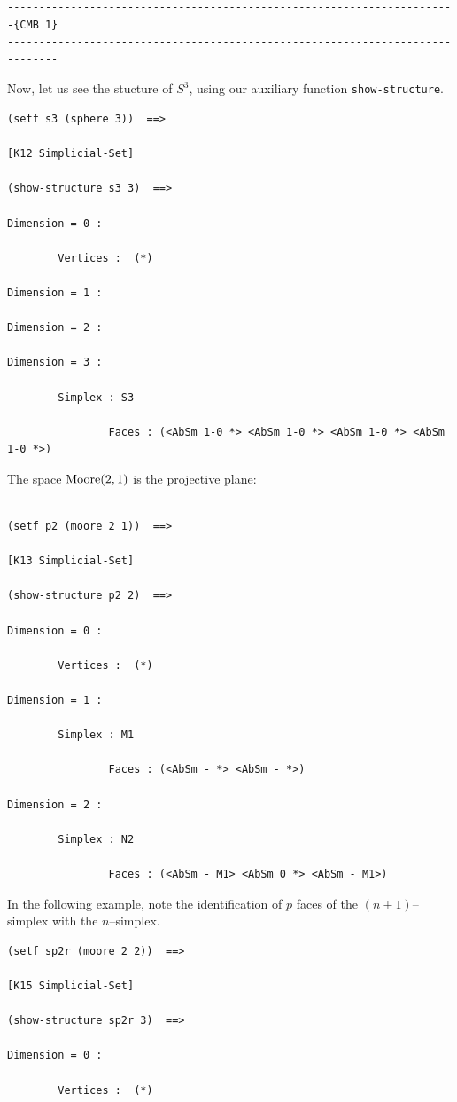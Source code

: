 {{\begin{verbatim}
-----------------------------------------------------------------------{CMB 1}
------------------------------------------------------------------------------

\end{verbatim}}

Now, let us see the stucture of $S^3$, using our auxiliary function {\tt show-structure}.
{\footnotesize\begin{verbatim}
(setf s3 (sphere 3))  ==>

[K12 Simplicial-Set]

(show-structure s3 3)  ==>

Dimension = 0 :

        Vertices :  (*)

Dimension = 1 :

Dimension = 2 :

Dimension = 3 :

        Simplex : S3

                Faces : (<AbSm 1-0 *> <AbSm 1-0 *> <AbSm 1-0 *> <AbSm 1-0 *>)
\end{verbatim}}

The space ${\rm Moore}(2,1)$ is the projective plane:
{\footnotesize\begin{verbatim}

(setf p2 (moore 2 1))  ==>

[K13 Simplicial-Set]

(show-structure p2 2)  ==>

Dimension = 0 :

        Vertices :  (*)

Dimension = 1 :

        Simplex : M1

                Faces : (<AbSm - *> <AbSm - *>)

Dimension = 2 :

        Simplex : N2

                Faces : (<AbSm - M1> <AbSm 0 *> <AbSm - M1>)
\end{verbatim}}
In the following example, note the identification of $p$ faces 
of the $(n+1)$--simplex with the $n$--simplex.
{\footnotesize\begin{verbatim}
(setf sp2r (moore 2 2))  ==>

[K15 Simplicial-Set]

(show-structure sp2r 3)  ==>

Dimension = 0 :

        Vertices :  (*)


\end{verbatim}}}
